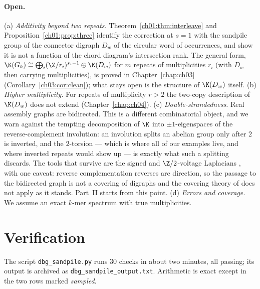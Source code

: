 \paragraph{Open.} (a) \emph{Additivity beyond two repeats.} Theorem~\ref{ch01:thm:interleave}
and Proposition~\ref{ch01:prop:three} identify the correction at $s=1$ with the sandpile group
of the connector digraph $D_w$ of the circular word of occurrences, and show it is not a
function of the chord diagram's intersection rank. The general form,
$\K(G_k)\cong\bigoplus_i(\Z/r_i)^{s_i-1}\oplus\K(D_w)$ for $m$ repeats of multiplicities
$r_i$ (with $D_w$ then carrying multiplicities), is proved in Chapter~\ref{chap:ch03}
(Corollary~\ref{ch03:cor:clean}); what stays open is the structure of $\K(D_w)$ itself.
(b) \emph{Higher multiplicity.} For repeats of multiplicity $r>2$ the two-copy description of
$\K(D_w)$ does not extend (Chapter~\ref{chap:ch04}). (c)
\emph{Double-strandedness.} Real assembly graphs are bidirected. This is a different
combinatorial object, and we warn against the tempting decomposition of $\K$ into
$\pm1$-eigenspaces of the reverse-complement involution: an involution splits an abelian
group only after $2$ is inverted, and the $2$-torsion --- which is where all of our
examples live, and where inverted repeats would show up --- is exactly what such a
splitting discards. The tools that survive are the signed and $\Z/2$-voltage Laplacians
\cite{Zas82,RT14}, with one caveat: reverse complementation reverses arc direction, so
the passage to the bidirected graph is not a covering of digraphs and the covering theory
of \cite{RT14} does not apply as it stands. Part~II starts from this point. (d) \emph{Errors and coverage.} We assume an exact $k$-mer spectrum
with true multiplicities.

\section{Verification}\label{ch01:sec:battery}

The script \texttt{dbg\_sandpile.py} runs $30$ checks in about two minutes, all passing; its
output is archived as \texttt{dbg\_sandpile\_output.txt}. Arithmetic is exact except in the
two rows marked \emph{sampled}.

